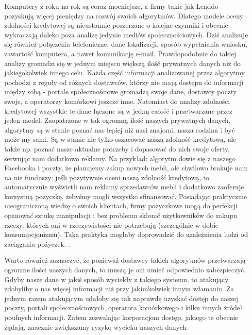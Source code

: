 \documentclass[polish]{kbk}
\begin{document}
Komputery z roku na rok są coraz mocniejsze, a firmy takie jak Lenddo pozyskują więcej pieniędzy na rozwój swoich algorytmów. Dlatego modele oceny zdolności kredytowej są nieustannie poszerzane o kolejne czynniki i obecnie wykraczają daleko poza analizę jedynie mediów społecznościowych. Dziś analizuje się również połączenia telefoniczne, dane lokalizacji, sposób wypełniania wniosku, zawartość komputera, a nawet komunikację e-mail. Prawdopodobnie do takiej analizy gromadzi się w jednym miejscu większą ilość prywatnych danych niż do jakiegokolwiek innego celu. Każda część informacji analizowanej przez algorytmy pochodzi z reguły od różnych dostawców, którzy nie mają dostępu do informacji między sobą - portale społecznościowe gromadzą swoje dane, dostawcy poczty swoje, a operatorzy komórkowi jeszcze inne. Natomiast do analizy zdolności kredytowej wszystkie te dane łączone są w jedną całość i przetwarzane przez jeden model. Zaopatrzone w tak ogromną ilość naszych prywatnych danych, algorytmy są w stanie poznać nas lepiej niż nasi znajomi, nasza rodzina i być może my sami. Są w stanie nie tylko oszacować naszą zdolność kredytową, ale także np. poznać nasze aktualne potrzeby i dopasować do nich swoje oferty, serwując nam dodatkowo reklamy. Na przykład: algorytm dowie się z naszego Facebooka i poczty, że planujemy zakup nowych mebli, ale chwilowo brakuje nam na nie funduszy; jeśli pozytywnie oceni naszą zdolność kredytową, to automatycznie wyświetli nam reklamy sprzedawców mebli i dodatkowo zaoferuje korzystną pożyczkę, żebyśmy mogli wszystko sfinansować. Posiadając praktycznie nieograniczoną wiedzę o swoich klientach, firmy pożyczkowe mogą do perfekcji opanować sztukę manipulacji i bez problemu skłonić użytkowników do zakupu rzeczy, których oni w rzeczywistości nie potrzebują (szczególnie w dobie konsumpcjonizmu). Taka praktyka mogłaby doprowadzić do uzależnienia ludzi od zaciągania pożyczek. \cite{slate}. 

Warto również zaznaczyć, że ponieważ dostawcy takich algorytmów przetwarzają ogromne ilości naszych danych, to muszą je oni umieć odpowiednio zabezpieczyć. Gdyby nasze dane w jakiś sposób wyciekły z takiego systemu, to atakujący zdobyliby o nas więcej informacji niż przy jakimkolwiek innym włamaniu. Za jednym razem atakującym udałoby się tak naprawdę uzyskać dostęp do naszej poczty, portali społecznościowych, operatora komórkowego i kilku innych źródeł poufnych informacji. Zatem zezwalając korporacjom dostęp, jakiego te obecnie żądają, znacznie zwiększamy ryzyko wycieku naszych danych.
\end{document}
